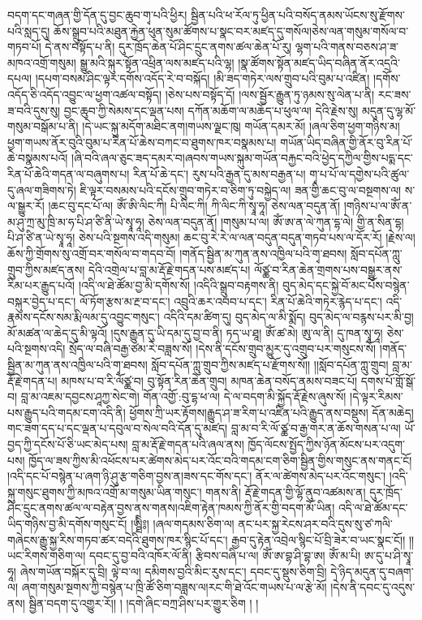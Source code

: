 བདག་དང་གཞན་གྱི་དོན་དུ་བྱང་ཆུབ་གྭ་པའི་ཕྱིར། སྦྱིན་པའི་ཕ་རོལ་ཏུ་ཕྱིན་པའི་བསོད་ནམས་ཡོངས་སུ་རྫོགས་པའི་སླད་དུ། ཆོས་སྒྲུབ་པའི་མཐུན་རྐྱེན་ཕུན་སུམ་ཚོགས་པ་སྣང་བར་མཛད་དུ་གསོལ།ཅེས་ལན་གསུམ་གསོལ་བ་གཏབ་པོ། དེ་ནས་བསྟོད་པ་ནི། དུར་ཁྲོད་ཆེན་པོ་ཤིང་དྲུང་ནགས་ཚལ་ཆེན་པོ་རུ། ལྷག་པའི་གནས་བཅས་ཤ་ཟ་མཁའ་འགྲོ་གསུམ། སྒྱུ་མའི་སྐུར་སྟོན་འཕྲིན་ལས་མཛད་པའི་ལྷ། །སྣ་ཚོགས་སྟོན་མཛད་ཡིད་བཞིན་ནོར་འདྲའི་དཔལ། །དཔག་བསམ་ཤིང་ལྟར་དགོས་འདོད་རེ་བ་བསྐོད། །མི་ཟད་གཏེར་ལས་གྲུབ་པའི་བུམ་པ་འཛིན། །དགོས་འདོད་ཅི་འདོད་འབྱུང་ལ་ཕྱག་འཚལ་བསྟོད། །ཅེས་པས་བསྟོད་དོ། །ལས་སྦྱོར་རྒྱུན་ཏུ་ཉམས་སུ་ལེན་པ་ནི། རང་ཟས་ཟ་བའི་དུས་སུ། བྱང་ཆུབ་ཀྱི་སེམས་དང་ལྡན་པས། དཀོན་མཆོག་ལ་མཆོད་པ་ཕུལ་ལ། དེའི་རྗེས་སུ། མདུན་དུ་ལྷ་མོ་གསུམ་བསྒོམ་པ་ནི། །དེ་ཡང་སྐུ་མདོག་མཐིང་ནག།གཡས་ལྗང་ཁུ། གཡོན་དམར་མོ། །ཞལ་ཅིག་ཕྱག་གཉིས་མ། ཕྱག་གཡས་ནོར་བུའི་བུམ་པ་རིན་པོ་ཆེས་བཀང་བ་ཐུགས་ཁར་བསྣམས་པ། གཡོན་ཡིད་བཞིན་གྱི་ནོར་བུ་རིན་པོ་ཆེ་བསྣམས་པའོ། །ཞི་བའི་ཞལ་ཅུང་ཟད་དམར་བ།ཞབས་གཡས་སྐུམ་གཡོན་བརྐྱང་བའི་ཕྱེད་དཀྱིལ་གྱིས་པདྨ་དང་རིན་པོ་ཆེའི་གདན་ལ་བཞུགས་པ། རིན་པོ་ཆེ་དང་། རུས་པའི་རྒྱན་དུ་མས་བརྒྱན་པ། གྭ་པ་པོ་ལ་དགྱེས་པའི་ཚུལ་དུ་ཞལ་གཟིགས་ཏེ། ཇི་ལྟར་བསམས་པའི་དངོས་གྲུབ་གཏེར་བ་ཅིག་ཏུ་བསྐྱེད་ལ། ཟན་གྱི་ཆང་བུ་ལ་བསྔགས་ལ། ས་ལ་སྒྱུར་རོ། །ཆང་བུ་དང་པོ་ལ། ཨོཾ་ཨི་ལིང་ཀི། པི་ལིང་ཀི། ཀི་ལིང་ཀི་སྭཱ་ཧཱ། ཅེས་ལན་བདུན་ནོ། །གཉིས་པ་ལ་ཨོཾ་ན་མ་ཤུ་ཀྲ་མུ་ཁྲི་མ་ཧ་པི་ཤ་ཙི་ནི་ཡེ་སྭཱ་ཧཱ། ཅེས་ལན་བདུན་ནོ། །གསུམ་པ་ལ། ཨོཾ་ཨ་ན་ལེ་ཀུན་དྷ་ལེ། གྱི་ན་སིན་དྷ། པི་ཤ་ཙི་ན་ཡེ་སྭཱ་ཧཱ། ཅེས་པའི་སྔགས་འདི་གསུམ། ཆང་བུ་རེ་རེ་ལ་ལན་བདུན་བདུན་གཏབ་པས་ལ་དོར་རོ། །རྗེས་ལ། ཆོས་ཀྱི་གྲོགས་སུ་འགྲོ་བར་གསོལ་བ་གདབ་བོ། །གནོད་སྦྱིན་མ་ཀུན་ནས་འཁྱིལ་པའི་གྭ་ཐབས། སློབ་དཔོན་ཀླུ་གྲུབ་ཀྱིས་མཛད་ནས། དེའི་འགྲེལ་པ་བླ་མ་རྡོ་རྗེ་གདན་པས་མཛད་པ། ལོཙྪ་བ་རིན་ཆེན་གྲགས་པས་བསྒྱུར་ནས་རིམ་པར་རྒྱུད་པའོ། །འདི་ལ་ཐེ་ཚོམ་བྱ་མི་དགོས་སོ། །འདིའི་སྒྲུབ་བརྟགས་ནི། བུད་མེད་དང་སྐྱེ་བོ་མང་པོས་བསྙེན་བསྐུར་བྱེད་པ་དང་། ལོ་ཏོག་རྩས་མ་རྔ་བ་དང་། འབྲུའི་ཆར་འབབ་པ་དང་། རིན་པོ་ཆེའི་གཏེར་རྙེད་པ་དང་། འདི་རྣམས་དངོས་སམ་རྨི་ལམ་དུ་འབྱུང་གསུང་། འདིའི་དམ་ཚིག་དུ། བུད་མེད་ལ་མི་སྨོད། བུད་མེད་ལ་བརྙས་པར་མི་བྱ། མོ་མཚན་ལ་ཆེད་དུ་མི་ལྟའོ། །དུས་རྒྱུན་དུ་ཡི་དམ་དུ་བྱ་བ་ནི། ཏད་ཡ་ཐཱ། ཨོཾ་ཚ་མེ། ཨུ་ལ་ནི། དུ་ཁན་སྭཱ་ཧཱ། ཅེས་པའི་སྔགས་འདི། སྲོད་ལ་བཞི་བརྒྱ་ཙམ་རེ་བཟླས་སོ། །དེས་ནི་དངོས་གྲུབ་མྱུར་དུ་འགྲུབ་པར་གསུངས་སོ། །གནོད་སྦྱིན་མ་ཀུན་ནས་འཁྱིལ་པའི་གྭ་ཐབས། སློབ་དཔོན་ཀླུ་གྲུབ་ཀྱིས་མཛད་པ་རྫོགས་སོ།། །།སློབ་དཔོན་ཀླུ་གྲུབ། བླ་མ་རྡོ་རྗེ་གདན་པ། མཁས་པ་བ་རི་ལོཙྪ་བ། བུ་སྟོན་རིན་ཆེན་གྲུབ། མཁན་ཆེན་བསོད་ནམས་བཟང་པོ། དགས་པོ་གློ་སྒོ་བ། བླ་མ་འཇམ་དབྱངས་ཤཱཀྱ་སེང་གེ། གོན་འགྱོ་:བུ་དྷ་ཕ་ལ། དེ་ལ་བདག་མི་སྐྱོད་རྡོ་རྗེས་ཞུས་སོ། །དེ་ལྟར་རིམས་པས་རྒྱུད་པའི་གདམ་ངག་འདི་ནི། ཕྱོགས་ཀྲི་ཡར་རྟོགས།རྒྱུད་ཤ་ཟ་རིག་པ་འཛིན་པའི་རྒྱུད་ནས་བསྡུས། དོན་མཆེད། གང་ཟག་དད་པ་དང་ལྡན་པ་དབུལ་བ་སེལ་བའི་དོན་དུ་མཛད། བླ་མ་བ་རི་ལོ་ཙྪ་བ་རྒྱ་གར་ན་ཆོས་གསན་པ་ལ། ཡོ་བྱད་ཀྱི་དངོས་པོ་ཅི་ཡང་མེད་པས། བླ་མ་རྡོ་རྗེ་གདན་པའི་ཞལ་ནས། ཁྱོད་ལོངས་སྤྱོད་ཀྱིས་ཉོན་མོངས་པར་འདུག་པས། ཁྱོད་ལ་ཟས་ཀྱིས་མི་འཕོངས་པར་ཚེགས་མེད་པར་འོང་བའི་གདམ་ངག་ཅིག་སྦྱིན་གྱིས་གསུང་ནས་གནང་ངོ། །འདི་དང་པོ་བསྙེན་པ་ཞག་ཉི་ཤུ་རྩ་གཅིག་བྱས་ན།ཟས་དང་གོས་དང་། ནོར་ལ་ཚེགས་མེད་པར་འོང་གསུང་། །འདི་སྐུ་གསུང་ཐུགས་ཀྱི་མཁའ་འགྲོ་མ་གསུམ་ཡིན་གསུང་། གནས་ནི། རྡོ་རྗེ་གདན་གྱི་ལྷོ་ནུབ་འཚམས་ན། དུར་ཁྲོད་ཤིང་དྲུང་ནགས་ཚལ་ལ་བརྟེན་བྱས་ནས་གནས།འཇིག་རྟེན་ཁམས་ཀྱི་ནོར་གྱི་བདག་མོ་ཡིན། འདི་ལ་ཐེ་ཚོམ་དང་ཡིད་གཉིས་བྱ་མི་དགོས་གསུང་ངོ། །ཨྠིི༔། །ཞལ་གདམས་ཅིག་ལ། ནང་པར་སྐྱ་རེངས་ཤར་བའི་དུས་སུ་ཙ་ཀལི་གཞེངས་རྒྱུ་སྐྱ་རིས་གཏབ་ཚར་བདེའི་ཐུགས་ཁར་སྙིང་པོ་དང་། རྒྱབ་དུ་རྟེན་འབྲེལ་སྙིང་པོ་བྲི་ཟེར་བ་ཡང་སྣང་ངོ།། །།ཡང་རིགས་གཅིག་ལ། དབང་དུ་བྱ་བའི་འཁོར་ལོ་ནི། རྩིབས་བཞི་པ་ལ། ཨོཾ་ཨ་བྷ་ཤི་བྷ་ཨ། ཨོཾ་མ་པི། ཨ་དུ་པ་ཤི་སྭཱ་ཧཱ། ཞེས་གཡོན་བསྐོར་དུ་བྲི། ལྟེ་བ་ལ། དམིགས་བྱའི་མིང་རུས་དང་། དབང་དུ་སྡུས་ཅིག་བྲི། དེ་ཉིད་མདུན་དུ་བཞག་ལ། ཞག་གསུམ་སྔགས་ཀྱི་བསྙེན་པ་ཁྲི་ཚོ་ཅིག་བཟླས་ལ།རང་གི་ཐེ་འོང་གཡས་པ་ལ་རྩེ་མོ། །དེས་ནི་དབང་དུ་འདུས་ནས། སྦྱིན་བདག་དུ་འགྱུར་རོ།། །
།དགེ་ཞིང་བཀྲ་ཤིས་པར་གྱུར་ཅིག ། །